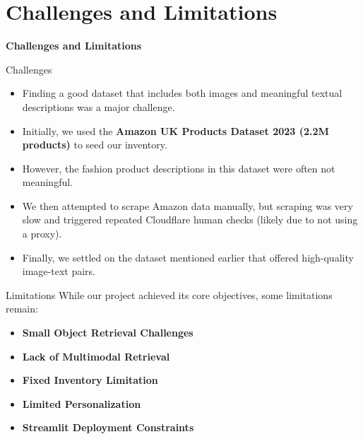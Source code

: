 \section{Challenges and Limitations}
\begin{frame}{}
  \Huge
  \centering
  \textbf{Challenges and Limitations}
  \normalsize
\end{frame}

\begin{frame}{Challenges}
  \begin{itemize}
      \item Finding a good dataset that includes both images and meaningful textual descriptions was a major challenge.
      \item Initially, we used the \textbf{Amazon UK Products Dataset 2023 (2.2M products)} to seed our inventory.
      \item However, the fashion product descriptions in this dataset were often not meaningful.
      \item We then attempted to scrape Amazon data manually, but scraping was very slow and triggered repeated Cloudflare human checks (likely due to not using a proxy).
      \item Finally, we settled on the dataset mentioned earlier that offered high-quality image-text pairs.
  \end{itemize}
  \end{frame}

  \begin{frame}{Limitations}
  While our project achieved its core objectives, some limitations remain:

  \begin{itemize}
      \item \textbf{Small Object Retrieval Challenges}
      \item \textbf{Lack of Multimodal Retrieval}
      \item \textbf{Fixed Inventory Limitation}
      \item \textbf{Limited Personalization}
      \item \textbf{Streamlit Deployment Constraints}
  \end{itemize}
  \end{frame}
